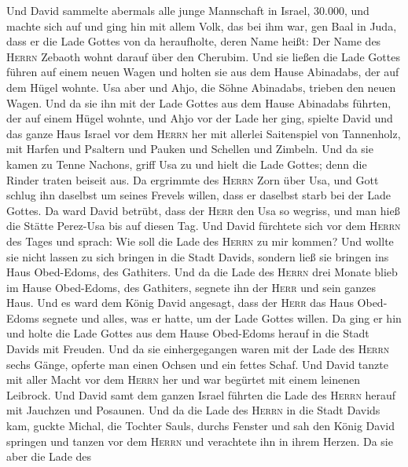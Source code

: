  Und David sammelte abermals alle junge Mannschaft in
Israel, 30.000,  und machte sich auf und ging hin mit
allem Volk, das bei ihm war, gen Baal in Juda, dass er die Lade Gottes
von da heraufholte, deren Name heißt: Der Name des \textsc{Herrn}
Zebaoth wohnt darauf über den Cherubim.  Und sie ließen
die Lade Gottes führen auf einem neuen Wagen und holten sie aus dem
Hause Abinadabs, der auf dem Hügel wohnte. Usa aber und Ahjo, die Söhne
Abinadabs, trieben den neuen Wagen.  Und da sie ihn mit
der Lade Gottes aus dem Hause Abinadabs führten, der auf einem Hügel
wohnte, und Ahjo vor der Lade her ging,  spielte David und
das ganze Haus Israel vor dem \textsc{Herrn} her mit allerlei
Saitenspiel von Tannenholz, mit Harfen und Psaltern und Pauken und
Schellen und Zimbeln.  Und da sie kamen zu Tenne Nachons,
griff Usa zu und hielt die Lade Gottes; denn die Rinder traten beiseit
aus.  Da ergrimmte des \textsc{Herrn} Zorn über Usa, und
Gott schlug ihn daselbst um seines Frevels willen, dass er daselbst
starb bei der Lade Gottes.  Da ward David betrübt, dass
der \textsc{Herr} den Usa so wegriss, und man hieß die Stätte Perez-Usa
bis auf diesen Tag.  Und David fürchtete sich vor dem
\textsc{Herrn} des Tages und sprach: Wie soll die Lade des
\textsc{Herrn} zu mir kommen?  Und wollte sie nicht
lassen zu sich bringen in die Stadt Davids, sondern ließ sie bringen ins
Haus Obed-Edoms, des Gathiters.  Und da die Lade des
\textsc{Herrn} drei Monate blieb im Hause Obed-Edoms, des Gathiters,
segnete ihn der \textsc{Herr} und sein ganzes Haus.  Und
es ward dem König David angesagt, dass der \textsc{Herr} das Haus
Obed-Edoms segnete und alles, was er hatte, um der Lade Gottes willen.
Da ging er hin und holte die Lade Gottes aus dem Hause Obed-Edoms herauf
in die Stadt Davids mit Freuden.  Und da sie
einhergegangen waren mit der Lade des \textsc{Herrn} sechs Gänge,
opferte man einen Ochsen und ein fettes Schaf.  Und David
tanzte mit aller Macht vor dem \textsc{Herrn} her und war begürtet mit
einem leinenen Leibrock.  Und David samt dem ganzen
Israel führten die Lade des \textsc{Herrn} herauf mit Jauchzen und
Posaunen.  Und da die Lade des \textsc{Herrn} in die
Stadt Davids kam, guckte Michal, die Tochter Sauls, durchs Fenster und
sah den König David springen und tanzen vor dem \textsc{Herrn} und
verachtete ihn in ihrem Herzen.  Da sie aber die Lade des
